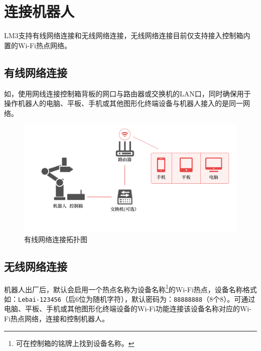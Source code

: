 

\section{连接机器人}
LM3支持有线网络连接和无线网络连接，无线网络连接目前仅支持接入控制箱内置的Wi-Fi热点网络。
\subsection{有线网络连接}

如，使用网线连接控制箱背板的网口与路由器或交换机的LAN口，同时确保用于操作机器人的电脑、平板、手机或其他图形化终端设备与机器人接入的是同一网络。

\begin{figure}[ht]
    \centering
    \includegraphics[width=\textwidth]{image/network-1.pdf}
    \caption{有线网络连接拓扑图}
    \label{fig:有线网络连接拓扑图}
\end{figure}


\subsection{无线网络连接}
机器人出厂后，默认会启用一个热点名称为设备名称\footnote{可在控制箱的铭牌上找到设备名称。}的Wi-Fi热点，设备名称格式如：\verb|Lebai-123456|（后6位为随机字符），默认密码为：\verb|88888888|（8个8）。可通过电脑、平板、手机或其他图形化终端设备的Wi-Fi功能连接该设备名称对应的Wi-Fi热点网络，连接和控制机器人。

